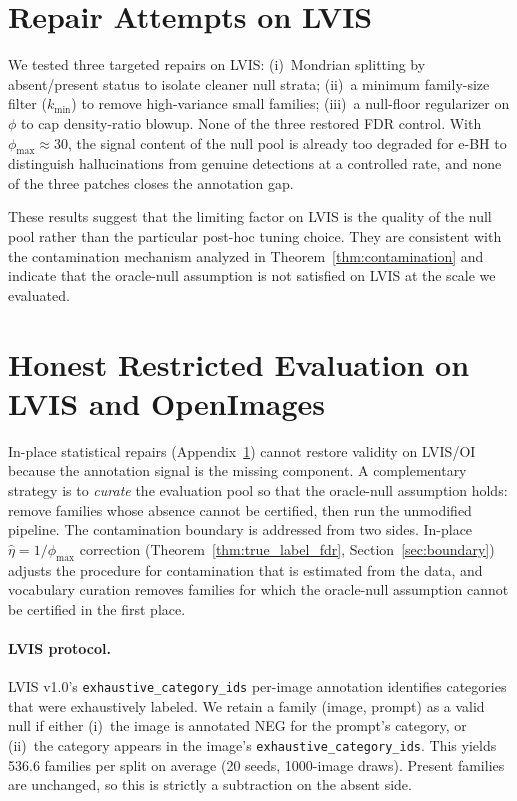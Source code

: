 \documentclass{article}
\theoremstyle{remark}
\newcommand{\1}{\mathbf{1}}
\begin{document}



\newpage
\appendix
\renewcommand{\thesection}{\Roman{section}}

\section{Repair Attempts on LVIS}
\label{app:repair}

We tested three targeted repairs on LVIS:
(i)~Mondrian splitting by absent/present status to isolate cleaner null strata;
(ii)~a minimum family-size filter ($k_{\min}$) to remove high-variance small families;
(iii)~a null-floor regularizer on $\phi$ to cap density-ratio blowup.
None of the three restored FDR control. With $\phi_{\max}\approx30$,
the signal content of the null pool is already too degraded for
e-BH to distinguish hallucinations from genuine detections at a
controlled rate, and none of the three patches closes the
annotation gap.

These results suggest that the limiting factor on LVIS is the
quality of the null pool rather than the particular post-hoc tuning
choice. They are consistent with the contamination mechanism
analyzed in Theorem~\ref{thm:contamination} and indicate that the
oracle-null assumption is not satisfied on LVIS at the scale we
evaluated.

\section{Honest Restricted Evaluation on LVIS and OpenImages}
\label{app:a1_honest}

In-place statistical repairs (Appendix~\ref{app:repair}) cannot restore
validity on LVIS/OI because the annotation signal is the missing
component. A complementary strategy is to \emph{curate} the evaluation
pool so that the oracle-null assumption holds: remove families whose
absence cannot be certified, then run the unmodified pipeline. The contamination boundary is addressed from two sides. In-place
$\hat\eta\!=\!1/\phi_{\max}$ correction
(Theorem~\ref{thm:true_label_fdr}, Section~\ref{sec:boundary})
adjusts the procedure for contamination that is estimated from the
data, and vocabulary curation removes families for which the
oracle-null assumption cannot be certified in the first place.

\paragraph{LVIS protocol.}
LVIS v1.0's \texttt{exhaustive\_category\_ids} per-image annotation
identifies categories that were exhaustively labeled. We retain a family
(image, prompt) as a valid null if either (i)~the image is annotated
NEG for the prompt's category, or (ii)~the category appears in the
image's \texttt{exhaustive\_category\_ids}. This yields 536.6 families
per split on average (20 seeds, 1000-image draws). Present families
are unchanged, so this is strictly a subtraction on the absent side.
\end{document}
